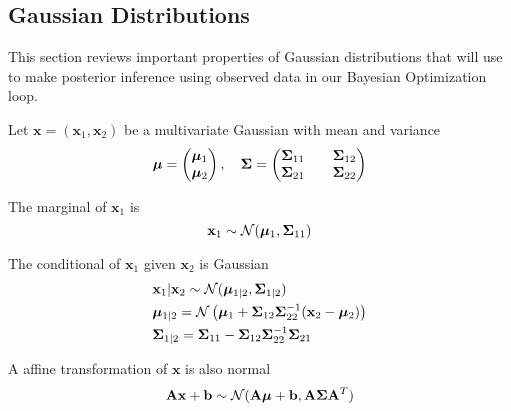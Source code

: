 \subsection{Gaussian Distributions}

This section reviews important properties of Gaussian distributions that will use to make posterior inference using observed data in our Bayesian Optimization loop.


\begin{theorem}
    Let $\mathbf{x} = (\mathbf{x}_1, \mathbf{x}_2)$ be a multivariate Gaussian with mean and variance
    \begin{equation*}
        \boldsymbol{\mu} = \begin{pmatrix}
            \boldsymbol{\mu}_1 \\ \boldsymbol{\mu}_2
        \end{pmatrix},\quad
        \boldsymbol{\Sigma} = \begin{pmatrix}
            \boldsymbol{\Sigma}_{11} && \boldsymbol{\Sigma}_{12} \\
            \boldsymbol{\Sigma}_{21} && \boldsymbol{\Sigma}_{22} \\
        \end{pmatrix}
    \end{equation*}

    The marginal of $\mathbf{x}_1$ is
    \begin{equation*}
        \mathbf{x}_{1} \sim \mathcal{N}(\boldsymbol{\mu}_1, \boldsymbol{\Sigma}_{11})
    \end{equation*}
    
    The conditional of $\mathbf{x}_1$ given $\mathbf{x}_2$ is Gaussian
    \begin{align*}
        &\mathbf{x}_1 | \mathbf{x}_2 \sim \mathcal{N}(\boldsymbol{\mu}_{1 | 2}, \boldsymbol{\Sigma}_{1 | 2}) \\
        &\boldsymbol{\mu}_{1 | 2} = \mathcal{N}\left(\boldsymbol{\mu}_1 + \boldsymbol{\Sigma}_{12} \boldsymbol{\Sigma}_{22}^{-1} (\mathbf{x}_2 - \boldsymbol{\mu}_2)\right) \\
        &\boldsymbol{\Sigma}_{1|2 } = \boldsymbol{\Sigma}_{11} - \boldsymbol{\Sigma}_{12} \boldsymbol{\Sigma}_{22}^{-1} \boldsymbol{\Sigma}_{21}
    \end{align*}
    
    A affine transformation of $\mathbf{x}$ is also normal
    \begin{equation*}
        \mathbf{Ax} + \mathbf{b} \sim \mathcal{N}(
        \mathbf{A} \boldsymbol{\mu} + \mathbf{b},
        \mathbf{A} \boldsymbol{\Sigma} \mathbf{A}^{T}
        )
    \end{equation*}
    


    
\end{theorem}

